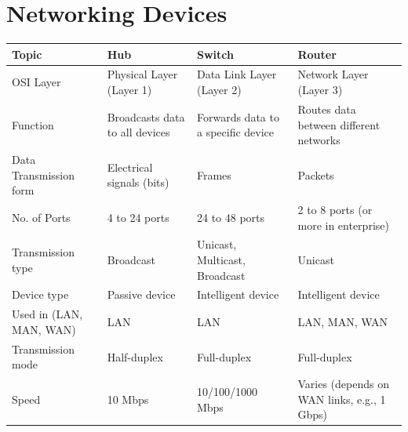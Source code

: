 \section{Networking Devices}
\begin{tabularx}{\textwidth}{|X|X|X|X|}
   \hline
   \textbf{Topic} & \textbf{Hub} & \textbf{Switch} & \textbf{Router} \\
   \hline
   OSI Layer & Physical Layer (Layer 1) & Data Link Layer (Layer 2) & Network Layer (Layer 3) \\
   \hline
   Function & Broadcasts data to all devices & Forwards data to a specific device & Routes data between different networks \\
   \hline
   Data Transmission form & Electrical signals (bits) & Frames & Packets \\
   \hline
   No. of Ports & 4 to 24 ports & 24 to 48 ports & 2 to 8 ports (or more in enterprise) \\
   \hline
   Transmission type & Broadcast & Unicast, Multicast, Broadcast & Unicast \\
   \hline
   Device type & Passive device & Intelligent device & Intelligent device \\
   \hline
   Used in (LAN, MAN, WAN) & LAN & LAN & LAN, MAN, WAN \\
   \hline
   Transmission mode & Half-duplex & Full-duplex & Full-duplex \\
   \hline
   Speed & 10 Mbps & 10/100/1000 Mbps & Varies (depends on WAN links, e.g., 1 Gbps) \\
   \hline
\end{tabularx}

